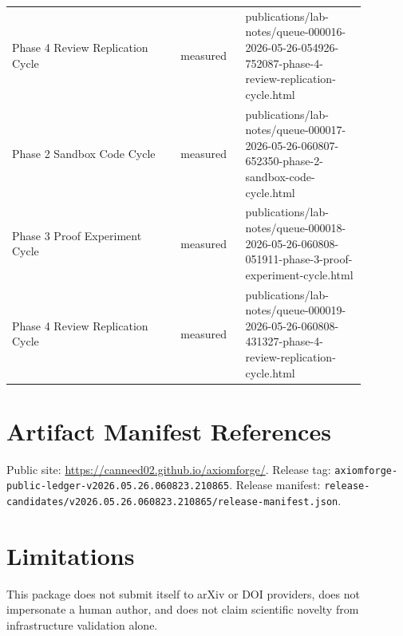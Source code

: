 \documentclass[11pt]{article}
\begin{document}
\begin{longtable}{p{0.42\linewidth}p{0.16\linewidth}p{0.30\linewidth}}
Phase 4 Review Replication Cycle & measured & publications/lab-notes/queue-000016-2026-05-26-054926-752087-phase-4-review-replication-cycle.html \\
Phase 2 Sandbox Code Cycle & measured & publications/lab-notes/queue-000017-2026-05-26-060807-652350-phase-2-sandbox-code-cycle.html \\
Phase 3 Proof Experiment Cycle & measured & publications/lab-notes/queue-000018-2026-05-26-060808-051911-phase-3-proof-experiment-cycle.html \\
Phase 4 Review Replication Cycle & measured & publications/lab-notes/queue-000019-2026-05-26-060808-431327-phase-4-review-replication-cycle.html \\
\end{longtable}

\section*{Artifact Manifest References}
Public site: \url{https://canneed02.github.io/axiomforge/}. Release tag:
\texttt{axiomforge-public-ledger-v2026.05.26.060823.210865}.
Release manifest:
\texttt{release-candidates/v2026.05.26.060823.210865/release-manifest.json}.

\section*{Limitations}
This package does not submit itself to arXiv or DOI providers, does not
impersonate a human author, and does not claim scientific novelty from
infrastructure validation alone.



\end{document}
